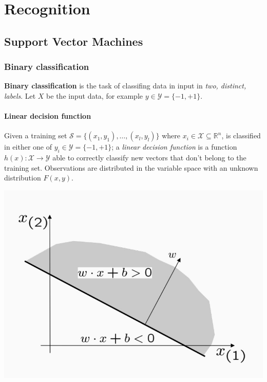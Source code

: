 \documentclass[10pt]{report}
\begin{document}
\part{Recognition}
\label{sec:org8c1c1b3}
\chapter{Support Vector Machines}
\label{sec:org6d2a698}
\section{Binary classification}
\label{binary-classification}
\textbf{Binary classification} is the task of classifing data in input in \emph{two,
distinct, labels}. Let \(X\) be the input data, for example
\(y \in \mathcal{Y} = \{-1 , +1\}\).

\subsection{Linear decision function}
\label{linear-decision-function}
Given a training set \(\mathcal{S} = \{(x_1, y_1), \dots, (x_l, y_l)\}\)
where \(x_i \in \mathcal{X} \subseteq \mathbb{R}^n\), is classified in
either one of \(y_i \in \mathcal{Y} = \{-1 , +1\}\); a \emph{linear decision
function} is a function \(h(x) : \mathcal{X} \rightarrow \mathcal{Y}\)
able to correctly classify new vectors that don't belong to the training
set. Observations are distributed in the variable space with an unknown
distribution \(F(x, y)\).

\begin{center}
\includegraphics[width=.9\linewidth]{./pics/svm/linear-decision-function.jpg}
\end{center}
\end{document}
